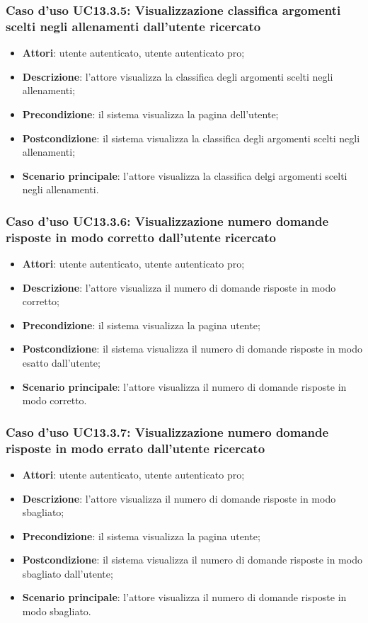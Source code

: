\subsubsection{Caso d'uso UC13.3.5: Visualizzazione classifica argomenti scelti negli allenamenti dall'utente ricercato}
\begin{itemize}
	\item\textbf{Attori}: utente autenticato, utente autenticato pro;
	\item\textbf{Descrizione}: l'attore visualizza la classifica degli argomenti scelti negli allenamenti;
	\item\textbf{Precondizione}: il sistema visualizza la pagina dell'utente;
	\item\textbf{Postcondizione}: il sistema visualizza la classifica degli argomenti scelti negli allenamenti;
	\item\textbf{Scenario principale}: l'attore visualizza la classifica delgi argomenti scelti negli allenamenti.
\end{itemize}

\subsubsection{Caso d'uso UC13.3.6: Visualizzazione numero domande risposte in modo corretto dall'utente ricercato}
\begin{itemize}
	\item\textbf{Attori}: utente autenticato, utente autenticato pro;
	\item\textbf{Descrizione}: l'attore visualizza il numero di domande risposte in modo corretto;
	\item\textbf{Precondizione}: il sistema visualizza la pagina utente;
	\item\textbf{Postcondizione}: il sistema visualizza il numero di domande risposte in modo esatto dall'utente;
	\item\textbf{Scenario principale}: l'attore visualizza il numero di domande risposte in modo corretto.
\end{itemize}

\subsubsection{Caso d'uso UC13.3.7: Visualizzazione numero domande risposte in modo errato dall'utente ricercato}
\begin{itemize}
	\item\textbf{Attori}: utente autenticato, utente autenticato pro;
	\item\textbf{Descrizione}: l'attore visualizza il numero di domande risposte in modo sbagliato;
	\item\textbf{Precondizione}: il sistema visualizza la pagina utente;
	\item\textbf{Postcondizione}: il sistema visualizza il numero di domande risposte in modo sbagliato dall'utente;
	\item\textbf{Scenario principale}: l'attore visualizza il numero di domande risposte in modo sbagliato.
\end{itemize}

